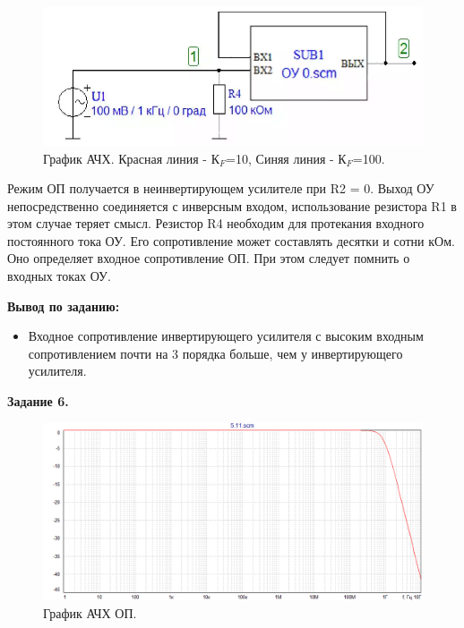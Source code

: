 \documentclass[a4paper,14pt]{extarticle}
\begin{document}
    \begin{figure}[h!]
        \begin{center}
            \includegraphics[scale=0.5]{14.png}
        \end{center}
        \vspace{-0.7cm}
        \caption{График АЧХ. Красная линия - $К_F$=10, Синяя линия - $К_F$=100.}
    \end{figure}

    Режим ОП получается в неинвертирующем усилителе при R2 = 0. Выход ОУ 
    непосредственно соединяется с инверсным входом, использование резистора 
    R1 в этом случае теряет смысл. Резистор R4 необходим для протекания 
    входного постоянного тока ОУ. Его сопротивление может составлять 
    десятки и сотни кОм. Оно определяет входное сопротивление ОП. При этом 
    следует помнить о входных токах ОУ.

    \textbf{Вывод по заданию:}

    \begin{itemize}
        \item Входное сопротивление инвертирующего усилителя с высоким входным сопротивлением почти на 3 порядка больше, чем у инвертирующего усилителя.
    \end{itemize}

    \newpage

    \begin{center}
        \textbf{Задание 6.}
    \end{center}
    \vspace{-0,5cm}
    \begin{figure}[h!]
        \begin{center}
            \includegraphics[scale=0.5]{15.png}
        \end{center}
        \vspace{-0.7cm}
        \caption{График АЧХ ОП.}
    \end{figure}
\end{document}
